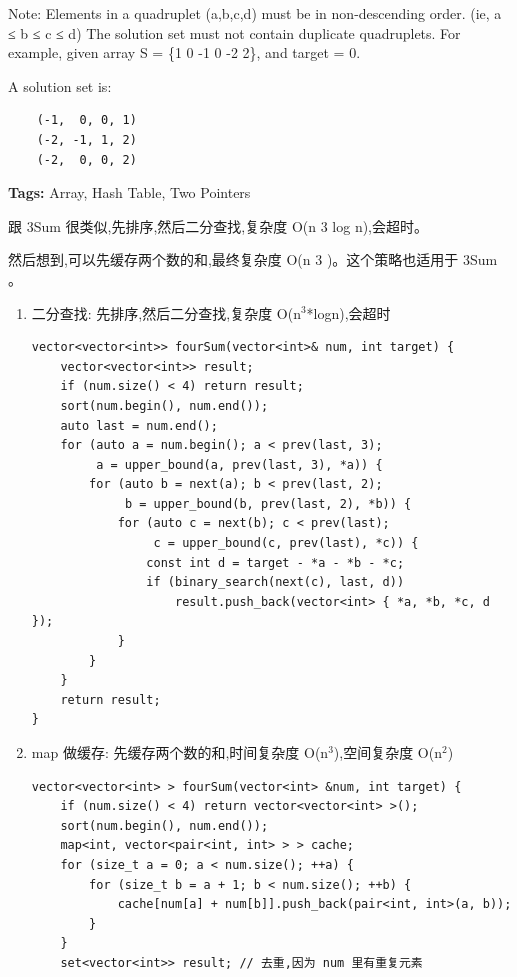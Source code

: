 \documentclass[12pt]{book}
\begin{document}
Note:
Elements in a quadruplet (a,b,c,d) must be in non-descending order. (ie, a ≤ b ≤ c ≤ d)
The solution set must not contain duplicate quadruplets.
    For example, given array S = \{1 0 -1 0 -2 2\}, and target = 0.

A solution set is:
\lstset{language=java,label= ,caption= ,numbers=none}
\begin{lstlisting}
    (-1,  0, 0, 1)
    (-2, -1, 1, 2)
    (-2,  0, 0, 2)
\end{lstlisting}

\textbf{Tags:} Array, Hash Table, Two Pointers

跟 3Sum 很类似,先排序,然后二分查找,复杂度 O(n 3 log n),会超时。

然后想到,可以先缓存两个数的和,最终复杂度 O(n 3 )。这个策略也适用于 3Sum 。

\begin{enumerate}
\item 二分查找: 先排序,然后二分查找,复杂度 O(n$^{\text{3}}$*logn),会超时
\label{sec-15-2-3-1}
\lstset{language=java,label= ,caption= ,numbers=none}
\begin{lstlisting}
vector<vector<int>> fourSum(vector<int>& num, int target) {
    vector<vector<int>> result;
    if (num.size() < 4) return result;
    sort(num.begin(), num.end());
    auto last = num.end();
    for (auto a = num.begin(); a < prev(last, 3);
         a = upper_bound(a, prev(last, 3), *a)) {
        for (auto b = next(a); b < prev(last, 2);
             b = upper_bound(b, prev(last, 2), *b)) {
            for (auto c = next(b); c < prev(last);
                 c = upper_bound(c, prev(last), *c)) {
                const int d = target - *a - *b - *c;
                if (binary_search(next(c), last, d))
                    result.push_back(vector<int> { *a, *b, *c, d });
            }
        }
    }
    return result;
}
\end{lstlisting}
\item map 做缓存: 先缓存两个数的和,时间复杂度 O(n$^{\text{3}}$),空间复杂度 O(n$^{\text{2}}$)
\label{sec-15-2-3-2}
\lstset{language=java,label= ,caption= ,numbers=none}
\begin{lstlisting}
vector<vector<int> > fourSum(vector<int> &num, int target) {
    if (num.size() < 4) return vector<vector<int> >();
    sort(num.begin(), num.end());
    map<int, vector<pair<int, int> > > cache;
    for (size_t a = 0; a < num.size(); ++a) {
        for (size_t b = a + 1; b < num.size(); ++b) {
            cache[num[a] + num[b]].push_back(pair<int, int>(a, b));
        }
    }
    set<vector<int>> result; // 去重,因为 num 里有重复元素

\end{lstlisting}
\end{enumerate}
\end{document}
